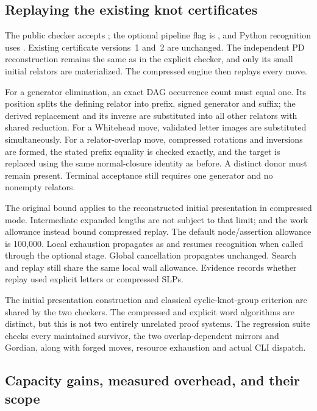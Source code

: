 \subsection{Replaying the existing knot certificates}

The public checker accepts ; the optional pipeline
flag is , and Python recognition uses
.  Existing certificate
versions~1 and~2 are unchanged.  The independent PD reconstruction remains
the same as in the explicit checker, and only its small initial relators
are materialized.  The compressed engine then replays every move.

For a generator elimination, an exact DAG occurrence count must equal one.
Its position splits the defining relator into prefix, signed generator
and suffix; the derived replacement and its inverse are substituted into
all other relators with shared reduction.  For a Whitehead move, validated
letter images are substituted simultaneously.  For a relator-overlap
move, compressed rotations and inversions are formed, the stated prefix
equality is checked exactly, and the target is replaced using the same
normal-closure identity as before.  A distinct donor must remain present.
Terminal acceptance still requires one generator and no nonempty relators.

The original  bound applies to the reconstructed initial
presentation in compressed mode.  Intermediate expanded lengths are not
subject to that limit;  and the work allowance instead
bound compressed replay.  The default node/assertion allowance is 100,000.
Local exhaustion propagates as  and resumes recognition
when called through the optional stage.  Global cancellation propagates
unchanged.  Search and replay still share the same local wall allowance.
Evidence records whether replay used explicit letters or compressed SLPs.

The initial presentation construction and classical cyclic-knot-group
criterion are shared by the two checkers.  The compressed and explicit
word algorithms are distinct, but this is not two entirely unrelated
proof systems.  The regression suite checks every maintained survivor,
the two overlap-dependent mirrors and Gordian, along with forged moves,
resource exhaustion and actual CLI dispatch.

\subsection{Capacity gains, measured overhead, and their scope}

